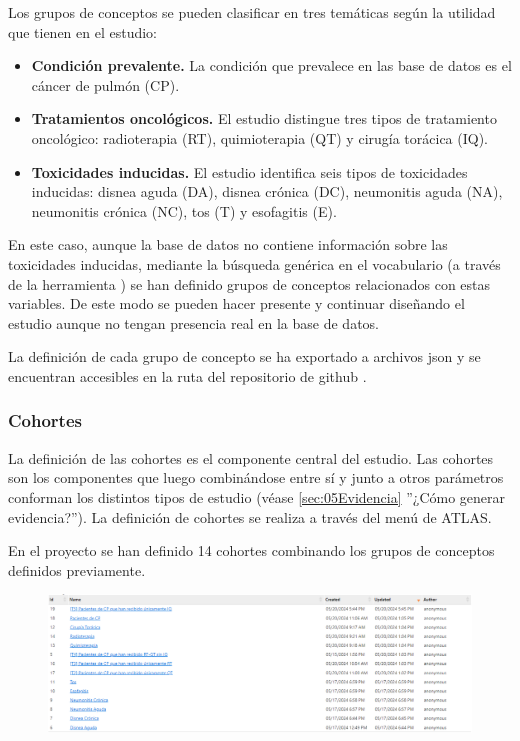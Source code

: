 Los grupos de conceptos se pueden clasificar en tres temáticas según la utilidad que tienen en el estudio:

\begin{itemize}

    \item \textbf{Condición prevalente.} La condición que prevalece en las base de datos es el cáncer de pulmón (CP).
    \item \textbf{Tratamientos oncológicos.} El estudio distingue tres tipos de tratamiento oncológico: radioterapia (RT), quimioterapia (QT) y cirugía torácica (IQ).
    \item \textbf{Toxicidades inducidas.} El estudio identifica seis tipos de toxicidades inducidas: disnea aguda (DA), disnea crónica (DC), neumonitis aguda (NA), neumonitis crónica (NC), tos (T) y esofagitis (E).
    
\end{itemize}

En este caso, aunque la base de datos no contiene información sobre las toxicidades inducidas, mediante la búsqueda genérica en el vocabulario (a través de la herramienta ) se han definido grupos de conceptos relacionados con estas variables. De este modo se pueden hacer presente y continuar diseñando el estudio aunque no tengan presencia real en la base de datos. 

La definición de cada grupo de concepto se ha exportado a archivos json y se encuentran accesibles en la ruta del repositorio de github .

\subsubsection{Cohortes}

La definición de las cohortes es el componente central del estudio. Las cohortes son los componentes que luego combinándose entre sí y junto a otros parámetros conforman los distintos tipos de estudio (véase \ref{sec:05Evidencia} ''¿Cómo generar evidencia?''). La definición de cohortes se realiza a través del menú  de ATLAS.

En el proyecto se han definido 14 cohortes combinando los grupos de conceptos definidos previamente.

\begin{figure}[H]
    \centering
    \includegraphics[width=1\textwidth]{tables/cohortLIST.png}
    \label{table:cohortLIST}
\end{figure}

